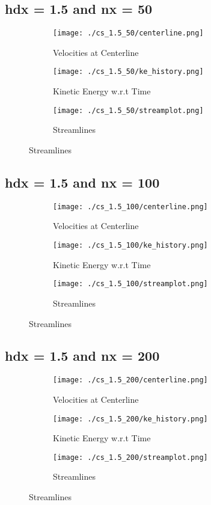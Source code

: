 \documentclass[12pt, a4paper]{report}
\begin{document}
\subsection{hdx = 1.5 and nx = 50}
\begin{figure}[H]
\begin{subfigure}{0.5\textwidth}
	\texttt{[image: ./cs\_1.5\_50/centerline.png]}
	\caption{Velocities at Centerline}
\end{subfigure}
\begin{subfigure}{0.5\textwidth}
	\texttt{[image: ./cs\_1.5\_50/ke\_history.png]}
	\caption{Kinetic Energy w.r.t Time}
\end{subfigure}
\medskip
\begin{subfigure}{\textwidth}
	\centering
	\texttt{[image: ./cs\_1.5\_50/streamplot.png]}
	\caption{Streamlines}
\end{subfigure}
\end{figure}

\subsection{hdx = 1.5 and nx = 100}
\begin{figure}[H]
\begin{subfigure}{0.5\textwidth}
	\texttt{[image: ./cs\_1.5\_100/centerline.png]}
	\caption{Velocities at Centerline}
\end{subfigure}
\begin{subfigure}{0.5\textwidth}
	\texttt{[image: ./cs\_1.5\_100/ke\_history.png]}
	\caption{Kinetic Energy w.r.t Time}
\end{subfigure}
\medskip
\begin{subfigure}{\textwidth}
	\texttt{[image: ./cs\_1.5\_100/streamplot.png]}
	\caption{Streamlines}
\end{subfigure}
\end{figure}

\subsection{hdx = 1.5 and nx = 200}
\begin{figure}[H]
\begin{subfigure}{0.5\textwidth}
	\texttt{[image: ./cs\_1.5\_200/centerline.png]}
	\caption{Velocities at Centerline}
\end{subfigure}
\begin{subfigure}{0.5\textwidth}
	\texttt{[image: ./cs\_1.5\_200/ke\_history.png]}
	\caption{Kinetic Energy w.r.t Time}
\end{subfigure}
\medskip
\begin{subfigure}{\textwidth}
	\texttt{[image: ./cs\_1.5\_200/streamplot.png]}
	\caption{Streamlines}
\end{subfigure}
\end{figure}
\end{document}
